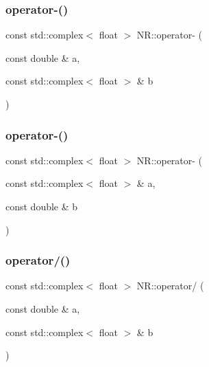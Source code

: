 \mbox{\label{namespaceNR_ad075d6845549afa367e8eabac06de42c}} 
\subsubsection{\texorpdfstring{operator-\/()}{operator-()}\hspace{0.1cm}{\footnotesize\ttfamily [1/2]}}
{\footnotesize\ttfamily const std\+::complex$<$ float $>$ N\+R\+::operator-\/ (\begin{DoxyParamCaption}\item[{const double \&}]{a,  }\item[{const std\+::complex$<$ float $>$ \&}]{b }\end{DoxyParamCaption})\hspace{0.3cm}{\ttfamily [inline]}}

\mbox{\label{namespaceNR_a24cad7076ed686ce43abaceed12e4a91}} 
\subsubsection{\texorpdfstring{operator-\/()}{operator-()}\hspace{0.1cm}{\footnotesize\ttfamily [2/2]}}
{\footnotesize\ttfamily const std\+::complex$<$ float $>$ N\+R\+::operator-\/ (\begin{DoxyParamCaption}\item[{const std\+::complex$<$ float $>$ \&}]{a,  }\item[{const double \&}]{b }\end{DoxyParamCaption})\hspace{0.3cm}{\ttfamily [inline]}}

\mbox{\label{namespaceNR_a3b52a0a9d6e4087547b3be89ce0c646b}} 
\subsubsection{\texorpdfstring{operator/()}{operator/()}\hspace{0.1cm}{\footnotesize\ttfamily [1/2]}}
{\footnotesize\ttfamily const std\+::complex$<$ float $>$ N\+R\+::operator/ (\begin{DoxyParamCaption}\item[{const double \&}]{a,  }\item[{const std\+::complex$<$ float $>$ \&}]{b }\end{DoxyParamCaption})\hspace{0.3cm}{\ttfamily [inline]}}

